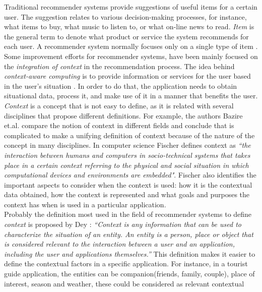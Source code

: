 Traditional recommender systems provide suggestions of useful items
for a certain user. The suggestion relates to various decision-making
processes, for instance, what items to buy, what music to listen to, or
what on-line news to read. \textit{Item} is the general term to denote
what product or service the system recommends for each user. A
recommender system normally focuses only on a single type of item
 \cite{resnick1997recommender}.
Some improvement efforts for recommender systems, have been mainly
focused on the
\textit{integration of context} in the recommendation process. 
The idea behind \textit{context-aware computing} is to provide
information or services for the user based in the user's situation
 \cite{dey2001understanding}. In order to do that, the application 
needs to obtain situational data, process it, and make use of it 
in a manner that benefits the user. \\ 
\textit{Context} is a concept that is not easy to define, as it is related with
several disciplines that propose different definitions. For example,
the authors Bazire et.al. \cite{bazire2005understanding} compare the
notion of context in different fields and conclude that is complicated to make a
unifying definition of context because of the nature of the concept in
many disciplines. In computer science Fischer \cite{fischer2012context}
defines context as \textit{``the interaction between humans and
computers in socio-technical systems that takes place in a certain
context referring to the physical and social situation in which
computational devices and environments are embedded"}. 
Fischer also identifies
the important aspects to consider when the context is used: how it is
the contextual data obtained, how the context is represented and what
goals and purposes the context has when is used in a particular
application. \\
Probably the definition most used in the field of recommender systems to 
define \textit{context} is proposed by Dey \cite{dey2001understanding}:
\textit{``Context is any information that can be used to characterize
the situation of an entity. An entity is a person, place or object
that is considered relevant to the interaction between a user and an
application, including the user and applications themselves.''}  This
definition makes it easier to define the contextual factors in a
specific application. For instance, in a tourist guide application, the
entities can be companion(friends, family, couple), place of interest,
season and weather, these could be considered as relevant contextual
